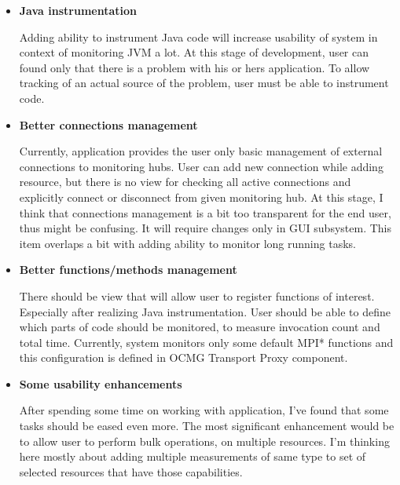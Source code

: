 \begin{itemize}
\item {\bf Java instrumentation}

Adding ability to instrument Java code will increase usability of system in context of monitoring JVM a lot. At this stage of development, user can found only that there is a problem with his or hers application. To allow tracking of an actual source of the problem, user must be able to instrument code.      
     
\item {\bf Better connections management}

Currently, application provides the user only basic management of external connections to monitoring hubs. User can add new connection while adding resource, but there is no view for checking all active connections and explicitly connect or disconnect from given monitoring hub. At this stage, I think that connections management is a bit too transparent for the end user, thus might be confusing. It will require changes only in GUI subsystem. This item overlaps a bit with adding ability to monitor long running tasks.

\item{\bf Better functions/methods management}

There should be view that will allow user to register functions of interest. Especially after realizing Java instrumentation. User should be able to define which parts of code should be monitored, to measure invocation count and total time. Currently, system monitors only some default MPI* functions and this configuration is defined in OCMG Transport Proxy component.

\item {\bf Some usability enhancements}

After spending some time on working with application, I\rq{}ve found that some tasks should be eased even more. The most significant enhancement would be to allow user to perform bulk operations, on multiple resources. I\rq{}m thinking here mostly about adding multiple measurements of same type to set of selected resources that have those capabilities. 

\end{itemize}